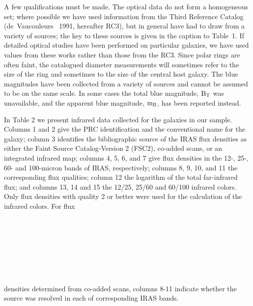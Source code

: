 A few qualifications must be made.  The optical data do not form a  
homogeneous set; where possible we have used information from the 
Third Reference Catalog (de~Vaucouleurs \etal\ 1991, hereafter RC3), but in 
general have had to draw from a variety of sources; the key to these sources 
is given in the caption to Table~1.  If detailed  
optical studies have been performed on particular galaxies, we have used 
values from these works rather than those from the RC3.  Since polar rings 
are often faint, the catalogued diameter measurements will sometimes 
refer to the size of the ring and sometimes to the size of the central 
host galaxy.  The blue magnitudes have been collected from a variety of
sources and cannot be assumed to be on the same scale.  
In some cases the total blue magnitude, $\rm B_T$ was unavailable, and the 
apparent blue magnitude, $\rm m_B$, has been reported instead.

In Table 2 we present infrared data collected for the galaxies in our sample.
Columns 1 and 2 give the PRC identification and the conventional name 
for the galaxy; column 3 identifies the bibliographic source 
of the IRAS flux densities as either the Faint Source Catalog-Version 2 (FSC2), 
co-added scans, or an integrated infrared map; 
columns 4, 5, 6, and 7 give flux densities in the 12-, 25-, 60- 
and 100-micron bands of IRAS, respectively; columns 8, 9, 10, and 11 
the corresponding flux qualities; 
column 12 the logarithm of the total 
far-infrared flux; and columns 13, 14 and 15 the 
12/25, 25/60 and 60/100 infrared colors.  Only flux densities with quality  
2 or better were used for the calculation of the infrared 
colors.  For flux 
\break

~

\vfil\eject

~

\vfil\eject

~

\vfil\eject

~

\vfil\eject


\noindent \hbox{densities} determined from co-added scans, 
columns 8-11 indicate whether the source was resolved in each of 
corresponding IRAS bands. 
 
